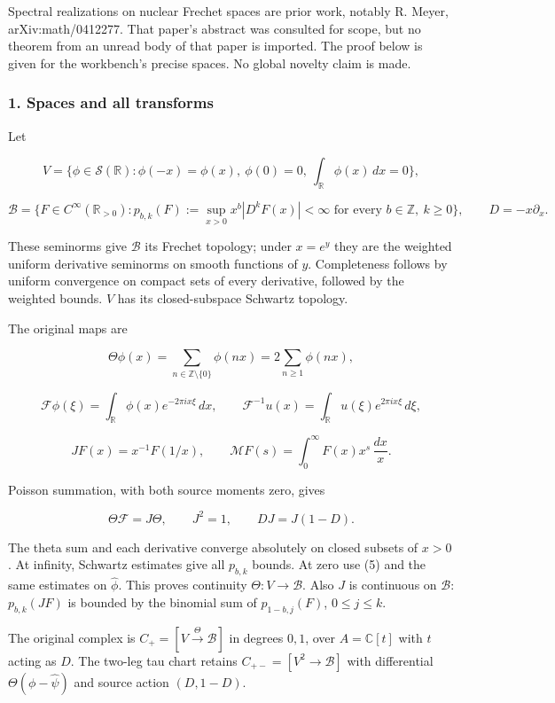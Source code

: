 Spectral realizations on nuclear Frechet spaces are prior work, notably R. Meyer,
arXiv:math/0412277. That paper's abstract was consulted for scope, but no theorem from an unread
body of that paper is imported. The proof below is given for the workbench's precise spaces. No
global novelty claim is made.

\subsubsection{1. Spaces and all transforms}\label{pr_10:spaces-and-all-transforms}

Let

\[V=\{\phi\in\mathcal S(\mathbb R):\phi(-x)=\phi(x),\ \phi(0)=0,\ \int_{\mathbb R}\phi(x)\,dx=0\},\]

\[\mathscr B=\{F\in C^\infty(\mathbb R_{>0}):
p_{b,k}(F):=\sup_{x>0}x^b|D^kF(x)|<\infty
\text{ for every }b\in\mathbb Z,\ k\ge0\},\qquad D=-x\partial_x.\tag{3}\]

These seminorms give \(\mathscr B\) its Frechet topology; under \(x=e^y\) they are the weighted
uniform derivative seminorms on smooth functions of \(y\). Completeness follows by uniform
convergence on compact sets of every derivative, followed by the weighted bounds. \(V\) has its
closed-subspace Schwartz topology.

The original maps are

\[\Theta\phi(x)=\sum_{n\in\mathbb Z\setminus\{0\}}\phi(nx)
=2\sum_{n\ge1}\phi(nx),\]

\[\mathcal F\phi(\xi)=\int_{\mathbb R}\phi(x)e^{-2\pi i x\xi}\,dx,\qquad
\mathcal F^{-1}u(x)=\int_{\mathbb R}u(\xi)e^{2\pi i x\xi}\,d\xi,\]

\[JF(x)=x^{-1}F(1/x),\qquad
\mathcal MF(s)=\int_0^\infty F(x)x^s\,\frac{dx}{x}.\tag{4}\]

Poisson summation, with both source moments zero, gives

\[\Theta\mathcal F=J\Theta,\qquad J^2=1,\qquad D J=J(1-D).\tag{5}\]

The theta sum and each derivative converge absolutely on closed subsets of \(x>0\). At infinity,
Schwartz estimates give all \(p_{b,k}\) bounds. At zero use (5) and the same estimates on
\(\widehat\phi\). This proves continuity \(\Theta:V\to\mathscr B\). Also \(J\) is continuous on
\(\mathscr B\): \(p_{b,k}(JF)\) is bounded by the binomial sum of \(p_{1-b,j}(F)\), \(0\le j\le k\).

The original complex is \(C_+=[V\xrightarrow\Theta\mathscr B]\) in degrees \(0,1\), over
\(A=\mathbb C[t]\) with \(t\) acting as \(D\). The two-leg tau chart retains
\(C_{+-}=[V^2\to\mathscr B]\) with differential \(\Theta(\phi-\widehat\psi)\) and source action
\((D,1-D)\).


